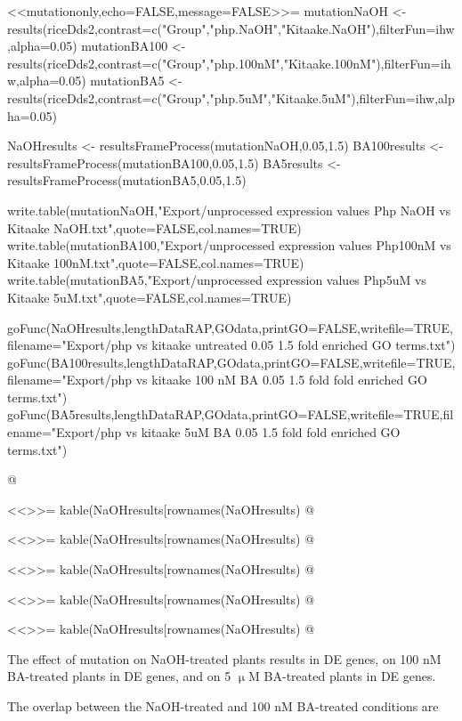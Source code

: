 \documentclass{article}
\begin{document}
{{{<<mutationonly,echo=FALSE,message=FALSE>>=
mutationNaOH <- results(riceDds2,contrast=c("Group","php.NaOH","Kitaake.NaOH"),filterFun=ihw,alpha=0.05)
mutationBA100 <- results(riceDds2,contrast=c("Group","php.100nM","Kitaake.100nM"),filterFun=ihw,alpha=0.05)
mutationBA5 <- results(riceDds2,contrast=c("Group","php.5uM","Kitaake.5uM"),filterFun=ihw,alpha=0.05)

NaOHresults <- resultsFrameProcess(mutationNaOH,0.05,1.5)
BA100results <- resultsFrameProcess(mutationBA100,0.05,1.5)
BA5results <- resultsFrameProcess(mutationBA5,0.05,1.5)

write.table(mutationNaOH,"Export/unprocessed expression values Php NaOH vs Kitaake NaOH.txt",quote=FALSE,col.names=TRUE)
write.table(mutationBA100,"Export/unprocessed expression values Php100nM vs Kitaake 100nM.txt",quote=FALSE,col.names=TRUE)
write.table(mutationBA5,"Export/unprocessed expression values Php5uM vs Kitaake 5uM.txt",quote=FALSE,col.names=TRUE)

goFunc(NaOHresults,lengthDataRAP,GOdata,printGO=FALSE,writefile=TRUE,filename="Export/php vs kitaake untreated 0.05 1.5 fold enriched GO terms.txt")
goFunc(BA100results,lengthDataRAP,GOdata,printGO=FALSE,writefile=TRUE,filename="Export/php vs kitaake 100 nM BA 0.05 1.5 fold fold enriched GO terms.txt")
goFunc(BA5results,lengthDataRAP,GOdata,printGO=FALSE,writefile=TRUE,filename="Export/php vs kitaake 5uM BA 0.05 1.5 fold fold enriched GO terms.txt")

@


<<>>=
kable(NaOHresults[rownames(NaOHresults) %
@

<<>>=
kable(NaOHresults[rownames(NaOHresults) %
@

<<>>=
kable(NaOHresults[rownames(NaOHresults) %
@

<<>>=
kable(NaOHresults[rownames(NaOHresults) %
@

<<>>=
kable(NaOHresults[rownames(NaOHresults) %
@

The effect of mutation on NaOH-treated plants results in  DE genes, on 100 nM BA-treated plants in  DE genes, and on 5 $\upmu$M BA-treated plants in  DE genes.

The overlap between the NaOH-treated and 100 nM BA-treated conditions are \Sexpr{sum(rownames(NaOHresults) %

}}}}
\end{document}
